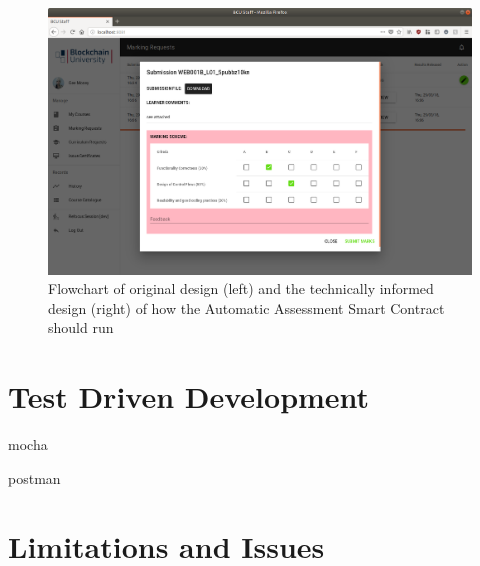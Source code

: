 \begin{figure}[!ht]
	\centering
	\includegraphics[width=1.0\textwidth]{Teacher_marking}
	\caption[Teacher Application Marking Requests Page]
	{Flowchart of original design (left) and the technically informed design (right) of how the Automatic Assessment Smart Contract should run}
	\label{fig:Teacher_marking}
\end{figure}

\section{Test Driven Development}

mocha

postman

\section{Limitations and Issues}